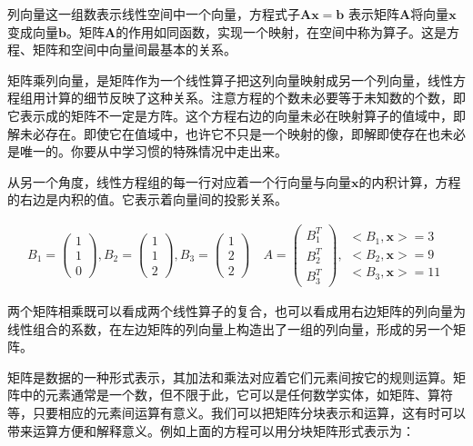 列向量这一组数表示线性空间中一个向量，方程式子$ \bm{ Ax=b } $ 表示矩阵$ \bm{A}$将向量$ \bm{x}$变成向量$ \bm{b}$。矩阵$ \bm{A}$的作用如同函数，实现一个映射，在空间中称为算子。这是方程、矩阵和空间中向量间最基本的关系。

矩阵乘列向量，是矩阵作为一个线性算子把这列向量映射成另一个列向量，线性方程组用计算的细节反映了这种关系。注意方程的个数未必要等于未知数的个数，即它表示成的矩阵不一定是方阵。这个方程右边的向量未必在映射算子的值域中，即解未必存在。即使它在值域中，也许它不只是一个映射的像，即解即使存在也未必是唯一的。你要从中学习惯的特殊情况中走出来。

从另一个角度，线性方程组的每一行对应着一个行向量与向量$ \bm{x} $的内积计算，方程的右边是内积的值。它表示着向量间的投影关系。

\begin{gather*}
	B_1 = \begin{pmatrix}
		1\\1\\0
	\end{pmatrix},
	B_2 = \begin{pmatrix}
		1\\1\\2
	\end{pmatrix},
	B_3 = \begin{pmatrix}
		1\\2\\2
	\end{pmatrix} \quad
	A = \begin{pmatrix}
		B_1^T\\B_2^T\\B_3^T
	\end{pmatrix},
	\begin{matrix}
		<B_1,\bm{x}>=3\\
		<B_2,\bm{x}>=9\\
		<B_3,\bm{x}>=11
	\end{matrix}
\end{gather*}

两个矩阵相乘既可以看成两个线性算子的复合，也可以看成用右边矩阵的列向量为线性组合的系数，在左边矩阵的列向量上构造出了一组的列向量，形成的另一个矩阵。

矩阵是数据的一种形式表示，其加法和乘法对应着它们元素间按它的规则运算。矩阵中的元素通常是一个数，但不限于此，它可以是任何数学实体，如矩阵、算符等，只要相应的元素间运算有意义。我们可以把矩阵分块表示和运算，这有时可以带来运算方便和解释意义。例如上面的方程可以用分块矩阵形式表示为：

